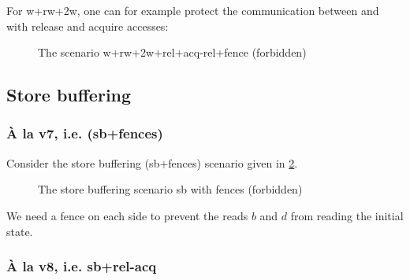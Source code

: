 \documentclass[a4paper]{article}
\begin{document}
\clearpage

For {\sf w+rw+2w}, one can for example protect the communication between
 and  with release and acquire accesses:

\begin{figure}[!h] 
\begin{center}
\end{center}
\vspace*{-8mm}
\caption{The scenario \textsf{w+rw+2w+rel+acq-rel+fence} \label{fig:w+rw+2w}
(forbidden)} 
\end{figure}

\clearpage

\subsection{Store buffering}

\subsubsection{\`A la v7, i.e. (\textsf{sb+fences})}

Consider the store buffering (\textsf{sb+fences}) scenario given in
\myfig\ref{fig:sb}.

\begin{figure}[!h]
\begin{center}
\end{center}
\vspace*{-5mm}
\caption{The store buffering scenario \textsf{sb} with fences (forbidden)
\label{fig:sb}}
\end{figure}

We need a fence on each side to prevent the reads $b$ and $d$ from reading the
initial state.


\subsubsection{\`A la v8, i.e. \textsf{sb+rel-acq}}
\end{document}
